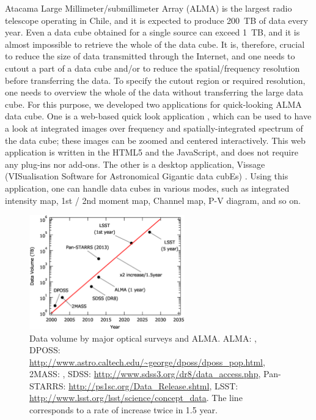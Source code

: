 \documentclass[11pt,twoside]{article}
\begin{document}
Atacama Large Millimeter/submillimeter Array (ALMA) is the largest radio 
telescope operating in Chile, and it is expected to produce 200~TB of 
data every year. 
Even a data cube obtained for a single source can exceed 1~TB, and it 
is almost impossible to retrieve the whole of the data cube. 
It is, therefore, crucial to reduce the size of data transmitted through 
the Internet, and one needs to cutout a part of a data cube and/or to 
reduce the spatial/frequency resolution before transferring the data. 
To specify the cutout region or required resolution, one needs to overview
the whole of the data without transferring the large data cube. 
For this purpose, we developed two applications for quick-looking ALMA data cube. 
One is a web-based quick look application \citep{O10_adassxxii}, 
which can be used to have a look at integrated images over frequency and 
spatially-integrated spectrum of the data cube; these images can be zoomed 
and centered interactively. 
This web application is written in the HTML5 and the JavaScript, and does 
not require any plug-ins nor add-ons. 
The other is a desktop application, Vissage (VISualisation Software for 
Astronomical Gigantic data cubEs) \citep{P047_adassxxii}. 
Using this application, one can handle data cubes in various modes, such 
as integrated intensity map, 1st / 2nd moment map, Channel map, P-V diagram, 
and so on. 

\begin{figure}
\begin{center}
\includegraphics[width = 0.6\textwidth]{D5_f1.eps}
\caption{Data volume by major optical surveys and ALMA.
ALMA: \citet{Lacy_2011},
DPOSS: \protect\url{http://www.astro.caltech.edu/~george/dposs/dposs_pop.html},
2MASS: \citet{Skrutskie_2006},
SDSS: \protect\url{http://www.sdss3.org/dr8/data_access.php},
Pan-STARRS: \protect\url{http://ps1sc.org/Data_Release.shtml},
LSST: \protect\url{http://www.lsst.org/lsst/science/concept_data}.
The line corresponds to a rate of increase twice in 1.5 year.
}
\label{fig:1}
\end{center}
\end{figure}
\end{document}
